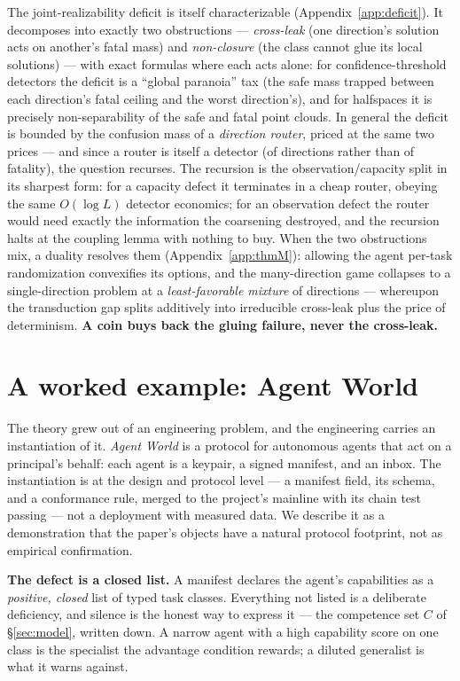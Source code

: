 \documentclass[11pt]{article}
\theoremstyle{plain}
\theoremstyle{definition}
\begin{document}
The joint-realizability deficit is itself characterizable (Appendix~\ref{app:deficit}). It
decomposes into exactly two obstructions --- \emph{cross-leak} (one direction's
solution acts on another's fatal mass) and \emph{non-closure} (the class cannot
glue its local solutions) --- with exact formulas where each acts alone: for
confidence-threshold detectors the deficit is a ``global paranoia'' tax (the
safe mass trapped between each direction's fatal ceiling and the worst
direction's), and for halfspaces it is precisely non-separability of the safe
and fatal point clouds. In general the deficit is bounded by the confusion
mass of a \emph{direction router}, priced at the same two prices --- and since a
router is itself a detector (of directions rather than of fatality), the
question recurses. The recursion is the observation/capacity split in its
sharpest form: for a capacity defect it terminates in a cheap router,
obeying the same $O(\log L)$ detector economics; for an observation defect
the router would need exactly the information the coarsening destroyed, and
the recursion halts at the coupling lemma with nothing to buy. When the two
obstructions mix, a duality resolves them (Appendix~\ref{app:thmM}): allowing the agent
per-task randomization convexifies its options, and the many-direction game
collapses to a single-direction problem at a \emph{least-favorable mixture} of
directions --- whereupon the transduction gap splits additively into
irreducible cross-leak plus the price of determinism. \textbf{A coin buys back the
gluing failure, never the cross-leak.}

\section{A worked example: Agent World}\label{sec:agentworld}

The theory grew out of an engineering problem, and the engineering carries an
instantiation of it. \emph{Agent World} is a protocol for autonomous agents that
act on a principal's behalf: each agent is a keypair, a signed manifest, and an
inbox. The instantiation is at the design and protocol level --- a manifest field,
its schema, and a conformance rule, merged to the project's mainline with its
chain test passing --- not a deployment with measured data. We describe it as a
demonstration that the paper's objects have a natural protocol footprint, not
as empirical confirmation.

\textbf{The defect is a closed list.} A manifest declares the agent's capabilities
as a \emph{positive, closed} list of typed task classes. Everything not listed is a
deliberate deficiency, and silence is the honest way to express it --- the
competence set $C$ of \S\ref{sec:model}, written down. A narrow agent with a high capability
score on one class is the specialist the advantage condition rewards; a diluted
generalist is what it warns against.
\end{document}
